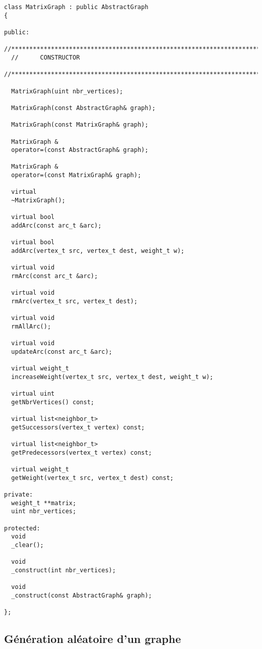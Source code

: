 \begin{verbatim}
class MatrixGraph : public AbstractGraph
{

public:
  //************************************************************************************************
  //      CONSTRUCTOR
  //************************************************************************************************

  MatrixGraph(uint nbr_vertices);

  MatrixGraph(const AbstractGraph& graph);

  MatrixGraph(const MatrixGraph& graph);

  MatrixGraph &
  operator=(const AbstractGraph& graph);

  MatrixGraph &
  operator=(const MatrixGraph& graph);

  virtual
  ~MatrixGraph();

  virtual bool
  addArc(const arc_t &arc);

  virtual bool
  addArc(vertex_t src, vertex_t dest, weight_t w);

  virtual void
  rmArc(const arc_t &arc);

  virtual void
  rmArc(vertex_t src, vertex_t dest);

  virtual void
  rmAllArc();

  virtual void
  updateArc(const arc_t &arc);

  virtual weight_t
  increaseWeight(vertex_t src, vertex_t dest, weight_t w);

  virtual uint
  getNbrVertices() const;

  virtual list<neighbor_t>
  getSuccessors(vertex_t vertex) const;

  virtual list<neighbor_t>
  getPredecessors(vertex_t vertex) const;

  virtual weight_t
  getWeight(vertex_t src, vertex_t dest) const;

private:
  weight_t **matrix;
  uint nbr_vertices;

protected:
  void
  _clear();

  void
  _construct(int nbr_vertices);

  void
  _construct(const AbstractGraph& graph);

};
\end{verbatim}

\subsection{Génération aléatoire d'un graphe}

